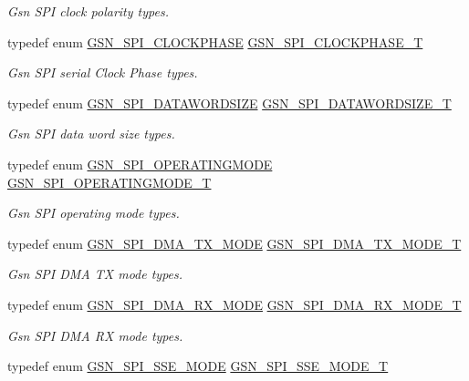 \begin{DoxyCompactItemize}
\begin{DoxyCompactList}\small\item\em Gsn SPI clock polarity types. \end{DoxyCompactList}\item 
typedef enum \hyperlink{a00655_gad25e484c9005210b7db2528764be5034}{GSN\_\-SPI\_\-CLOCKPHASE} \hyperlink{a00655_ga1399b803d30956e8ed6f4929033329ad}{GSN\_\-SPI\_\-CLOCKPHASE\_\-T}
\begin{DoxyCompactList}\small\item\em Gsn SPI serial Clock Phase types. \end{DoxyCompactList}\item 
typedef enum \hyperlink{a00655_ga52e3e63232981dd9e13226ef140541bf}{GSN\_\-SPI\_\-DATAWORDSIZE} \hyperlink{a00655_ga63cbe81427185213bde26b93dde72747}{GSN\_\-SPI\_\-DATAWORDSIZE\_\-T}
\begin{DoxyCompactList}\small\item\em Gsn SPI data word size types. \end{DoxyCompactList}\item 
typedef enum \hyperlink{a00655_ga4b04f6b757fd4a767ea05de3de79ad15}{GSN\_\-SPI\_\-OPERATINGMODE} \hyperlink{a00655_ga6621383791d81630bc4c294a7a3d292d}{GSN\_\-SPI\_\-OPERATINGMODE\_\-T}
\begin{DoxyCompactList}\small\item\em Gsn SPI operating mode types. \end{DoxyCompactList}\item 
typedef enum \hyperlink{a00655_gaf480fa60c7e6a9f132d47f0630a61b1a}{GSN\_\-SPI\_\-DMA\_\-TX\_\-MODE} \hyperlink{a00655_ga39efef290b5dfeaaa7892823d6bfd724}{GSN\_\-SPI\_\-DMA\_\-TX\_\-MODE\_\-T}
\begin{DoxyCompactList}\small\item\em Gsn SPI DMA TX mode types. \end{DoxyCompactList}\item 
typedef enum \hyperlink{a00655_ga21afd388959dd6b6c022109aa9a42586}{GSN\_\-SPI\_\-DMA\_\-RX\_\-MODE} \hyperlink{a00655_ga884b22be3cf70e4b96a0cda9b704390a}{GSN\_\-SPI\_\-DMA\_\-RX\_\-MODE\_\-T}
\begin{DoxyCompactList}\small\item\em Gsn SPI DMA RX mode types. \end{DoxyCompactList}\item 
typedef enum \hyperlink{a00655_ga03895c293b4a0520478212a5a031020d}{GSN\_\-SPI\_\-SSE\_\-MODE} \hyperlink{a00655_ga723e51f459ebae16b20d05a39ffd311a}{GSN\_\-SPI\_\-SSE\_\-MODE\_\-T}

\end{DoxyCompactItemize}

